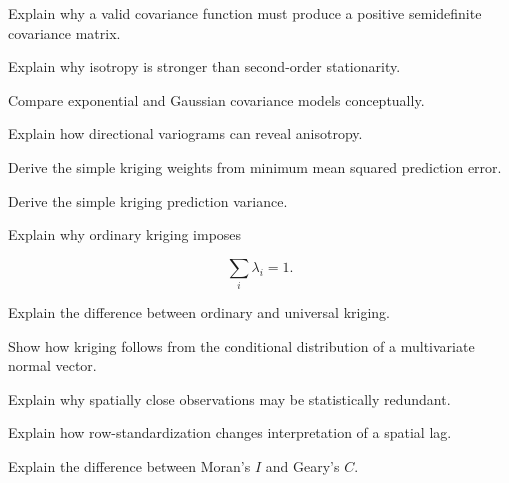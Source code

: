 \begin{exercise}[3]
Explain why a valid covariance function must produce a positive
semidefinite covariance matrix.
\end{exercise}

\begin{exercise}[3]
Explain why isotropy is stronger than second-order stationarity.
\end{exercise}

\begin{exercise}[3]
Compare exponential and Gaussian covariance models conceptually.
\end{exercise}

\begin{exercise}[3]
Explain how directional variograms can reveal anisotropy.
\end{exercise}

\begin{exercise}[3]
Derive the simple kriging weights from minimum mean squared prediction
error.
\end{exercise}

\begin{exercise}[3]
Derive the simple kriging prediction variance.
\end{exercise}

\begin{exercise}[3]
Explain why ordinary kriging imposes

\[
\sum_i\lambda_i=1.
\]
\end{exercise}

\begin{exercise}[3]
Explain the difference between ordinary and universal kriging.
\end{exercise}

\begin{exercise}[3]
Show how kriging follows from the conditional distribution of a
multivariate normal vector.
\end{exercise}

\begin{exercise}[3]
Explain why spatially close observations may be statistically redundant.
\end{exercise}

\begin{exercise}[3]
Explain how row-standardization changes interpretation of a spatial lag.
\end{exercise}

\begin{exercise}[3]
Explain the difference between Moran's \(I\) and Geary's \(C\).
\end{exercise}

